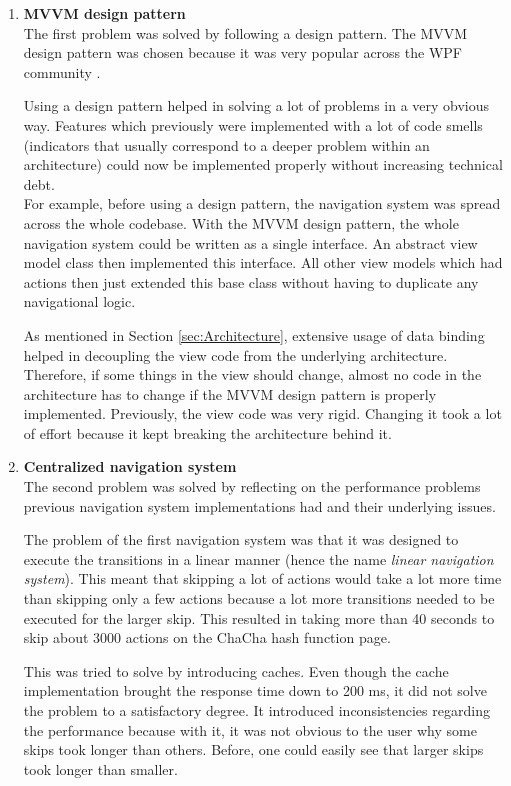 \begin{enumerate}[label=(\labelenum{S}{{\arabic*}}), wide, labelwidth=!, labelindent=0pt]
\setlength{\parskip}{0pt}

\item \textbf{MVVM design pattern}\\
The first problem was solved by following a design pattern. The MVVM design pattern was chosen because it was very popular across the WPF community \cite{mvvm-wpf}. 

Using a design pattern helped in solving a lot of problems in a very obvious way. Features which previously were implemented with a lot of code smells (indicators that usually correspond to a deeper problem within an architecture) could now be implemented properly without increasing technical debt.\\
For example, before using a design pattern, the navigation system was spread across the whole codebase. With the MVVM design pattern, the whole navigation system could be written as a single interface. An abstract view model class then implemented this interface. All other view models which had actions then just extended this base class without having to duplicate any navigational logic.

As mentioned in Section \ref{sec:Architecture}, extensive usage of data binding helped in decoupling the view code from the underlying architecture. Therefore, if some things in the view should change, almost no code in the architecture has to change if the MVVM design pattern is properly implemented. Previously, the view code was very rigid. Changing it took a lot of effort because it kept breaking the architecture behind it.

\item \textbf{Centralized navigation system}\\
The second problem was solved by reflecting on the performance problems previous navigation system implementations had and their underlying issues.

The problem of the first navigation system was that it was designed to execute the transitions in a linear manner (hence the name \textit{linear navigation system}). This meant that skipping a lot of actions would take a lot more time than skipping only a few actions because a lot more transitions needed to be executed for the larger skip. This resulted in taking more than 40 seconds to skip about 3000 actions on the ChaCha hash function page.

This was tried to solve by introducing caches. Even though the cache implementation brought the response time down to 200 ms, it did not solve the problem to a satisfactory degree. It introduced inconsistencies regarding the performance because with it, it was not obvious to the user why some skips took longer than others. Before, one could easily see that larger skips took longer than smaller.


\end{enumerate}
